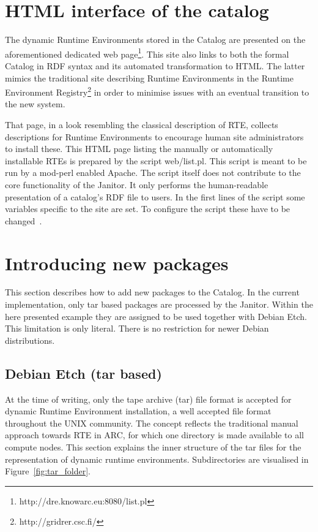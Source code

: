 {\section{HTML interface of the catalog}

The dynamic Runtime Environments stored in the
Catalog are presented on the aforementioned dedicated web
page\footnote{http://dre.knowarc.eu:8080/list.pl}. This site also
links to both the formal Catalog in RDF syntax and its automated
transformation to HTML. The latter mimics the traditional
site describing Runtime Environments in the Runtime Environment
Registry\footnote{http://gridrer.csc.fi/} in order to minimise issues
with an eventual transition to the new system.

That page, in a look resembling the classical description of RTE,
collects descriptions for Runtime Environments to encourage human site
administrators to install these.  This HTML page listing the manually or
automatically installable RTEs is prepared by the script web/list.pl.
This script is meant to be run by a mod-perl enabled Apache. The
script itself does not contribute to the core functionality of the
Janitor. It only performs the human-readable presentation of a catalog's
RDF file to users. In the first lines of the script some variables
specific to the site are set. To configure the script these have to be
changed~\cite[p. 9]{BAYER_2007}.

\section{Introducing new packages}\label{sec:catalog}\label{sec:introducing_new_packages}

This section describes how to add new packages to the Catalog. In
the current implementation, only tar based packages are processed by
the Janitor.  Within the here presented example they are assigned to
be used together with Debian Etch. This limitation is only literal.
There is no restriction for newer Debian distributions.

\subsection{Debian Etch (tar based)}

At the time of writing, only the tape archive (tar) file format is
accepted for dynamic Runtime Environment installation, a well accepted
file format throughout the UNIX community.
The concept reflects the
traditional manual approach towards RTE in ARC, for which one directory
is made available to all compute nodes.
This section explains the inner structure of the tar files for the
representation of dynamic runtime environments.  Subdirectories are
visualised in Figure~\ref{fig:tar_folder}.

}
